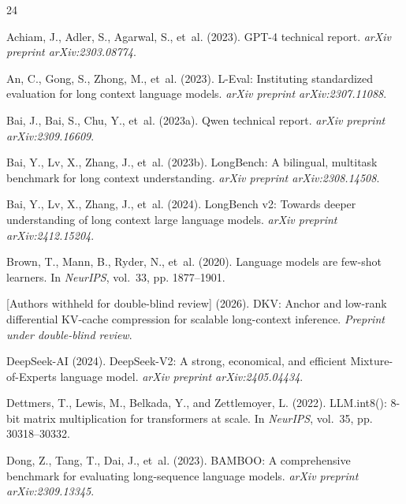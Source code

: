 \documentclass{article}
\theoremstyle{definition}
\begin{document}

\begingroup
\small
\begin{thebibliography}{24}

 Achiam, J., Adler, S., Agarwal, S., et~al. (2023). GPT-4 technical report. \textit{arXiv preprint arXiv:2303.08774}.

 An, C., Gong, S., Zhong, M., et~al. (2023). L-Eval: Instituting standardized evaluation for long context language models. \textit{arXiv preprint arXiv:2307.11088}.

 Bai, J., Bai, S., Chu, Y., et~al. (2023a). Qwen technical report. \textit{arXiv preprint arXiv:2309.16609}.

 Bai, Y., Lv, X., Zhang, J., et~al. (2023b). LongBench: A bilingual, multitask benchmark for long context understanding. \textit{arXiv preprint arXiv:2308.14508}.

 Bai, Y., Lv, X., Zhang, J., et~al. (2024). LongBench v2: Towards deeper understanding of long context large language models. \textit{arXiv preprint arXiv:2412.15204}.

 Brown, T., Mann, B., Ryder, N., et~al. (2020). Language models are few-shot learners. In \textit{NeurIPS}, vol.~33, pp. 1877--1901.

 [Authors withheld for double-blind review] (2026). DKV: Anchor and low-rank differential KV-cache compression for scalable long-context inference. \textit{Preprint under double-blind review}.

 DeepSeek-AI (2024). DeepSeek-V2: A strong, economical, and efficient Mixture-of-Experts language model. \textit{arXiv preprint arXiv:2405.04434}.

 Dettmers, T., Lewis, M., Belkada, Y., and Zettlemoyer, L. (2022). LLM.int8(): 8-bit matrix multiplication for transformers at scale. In \textit{NeurIPS}, vol.~35, pp. 30318--30332.

 Dong, Z., Tang, T., Dai, J., et~al. (2023). BAMBOO: A comprehensive benchmark for evaluating long-sequence language models. \textit{arXiv preprint arXiv:2309.13345}.


\end{thebibliography}
\end{document}
